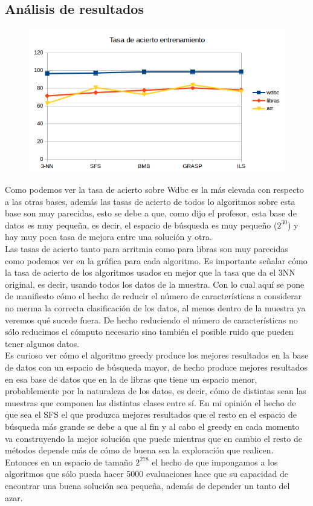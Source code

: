 \documentclass[10pt,a4paper]{article}
\begin{document}
\subsection{\color[rgb]{0.0,0.0,0.51}Análisis de resultados}


\begin{figure}[H]
\centering
\includegraphics[width=130mm]{tasa_train.png}
\end{figure}

Como podemos ver la tasa de acierto sobre Wdbc es la más elevada con respecto a las otras bases, además las tasas de acierto de todos lo algoritmos sobre esta base son muy parecidas, esto se debe a que, como dijo el profesor, esta base de datos es muy pequeña, es decir, el espacio de búsqueda es muy pequeño ($2^{30}$) y hay muy poca tasa de mejora entre una solución y otra.\\

Las tasas de acierto tanto para arritmia como para libras son muy parecidas como podemos ver en la gráfica para cada algoritmo. Es importante señalar cómo la tasa de acierto de los algoritmos usados en mejor que la tasa que da el 3NN original, es decir, usando todos los datos de la muestra. Con lo cual aquí se pone de manifiesto cómo el hecho de reducir el número de características a considerar no merma la correcta clasificación de los datos, al menos dentro de la muestra ya veremos qué sucede fuera. De hecho reduciendo el número de características no sólo reducimos el cómputo necesario sino también el posible ruido que pueden tener algunos datos.\\

Es curioso ver cómo el algoritmo greedy produce los mejores resultados en la base de datos con un espacio de búsqueda mayor, de hecho produce mejores resultados en esa base de datos que en la de libras que tiene un espacio menor, probablemente por la naturaleza de los datos, es decir, cómo de distintas sean las muestras que componen las distintas clases entre sí. En mi opinión el hecho de que sea el SFS el que produzca mejores resultados que el resto en el espacio de búsqueda más grande se debe a que al fin y al cabo el greedy en cada momento va construyendo la mejor solución que puede mientras que en cambio el resto de métodos depende más de cómo de buena sea la exploración que realicen. Entonces en un espacio de tamaño $2^{278}$ el hecho de que impongamos a los algoritmos que sólo pueda hacer 5000 evaluaciones hace que su capacidad de encontrar una buena solución sea pequeña, además de depender un tanto del azar.\\
\end{document}

